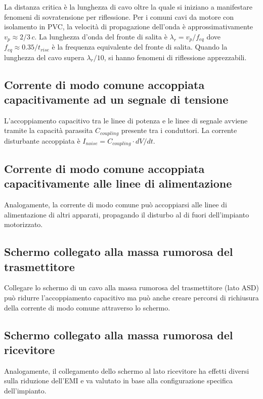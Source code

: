 La distanza critica è la lunghezza di cavo oltre la quale si iniziano a manifestare fenomeni di sovratensione per riflessione. Per i comuni cavi da motore con isolamento in PVC, la velocità di propagazione dell'onda è approssimativamente $v_p \approx 2/3\,c$. La lunghezza d'onda del fronte di salita è $\lambda_r = v_p / f_{eq}$ dove $f_{eq} \approx 0.35 / t_{rise}$ è la frequenza equivalente del fronte di salita. Quando la lunghezza del cavo supera $\lambda_r/10$, si hanno fenomeni di riflessione apprezzabili.

\subsection{Corrente di modo comune accoppiata capacitivamente ad un segnale di tensione}

L'accoppiamento capacitivo tra le linee di potenza e le linee di segnale avviene tramite la capacità parassita $C_{coupling}$ presente tra i conduttori. La corrente disturbante accoppiata è $I_{noise} = C_{coupling} \cdot dV/dt$.

\subsection{Corrente di modo comune accoppiata capacitivamente alle linee di alimentazione}

Analogamente, la corrente di modo comune può accoppiarsi alle linee di alimentazione di altri apparati, propagando il disturbo al di fuori dell'impianto motorizzato.

\subsection{Schermo collegato alla massa rumorosa del trasmettitore}

Collegare lo schermo di un cavo alla massa rumorosa del trasmettitore (lato ASD) può ridurre l'accoppiamento capacitivo ma può anche creare percorsi di richiusura della corrente di modo comune attraverso lo schermo.

\subsection{Schermo collegato alla massa rumorosa del ricevitore}

Analogamente, il collegamento dello schermo al lato ricevitore ha effetti diversi sulla riduzione dell'EMI e va valutato in base alla configurazione specifica dell'impianto.

